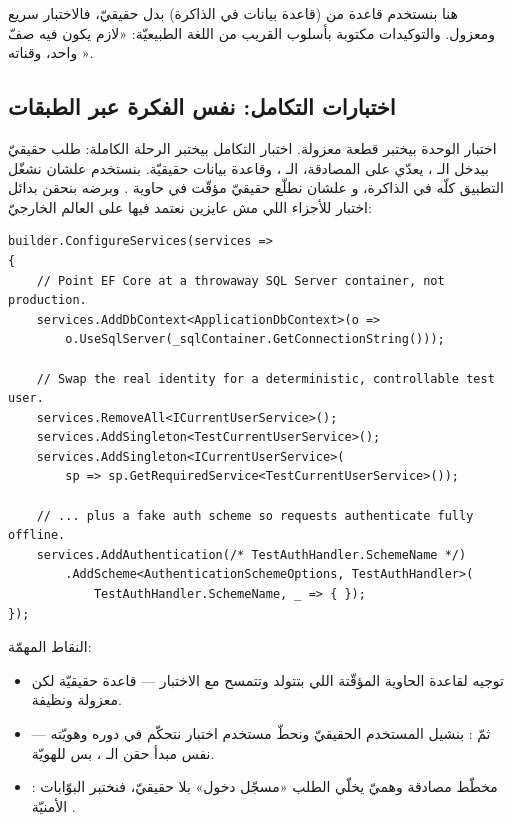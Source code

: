 هنا بنستخدم قاعدة  من  (قاعدة بيانات في الذاكرة) بدل  حقيقيّ، فالاختبار سريع ومعزول. والتوكيدات مكتوبة بأسلوب  القريب من اللغة الطبيعيّة: «لازم يكون فيه صفّ واحد، وقناته ».

\subsection{اختبارات التكامل: نفس الفكرة عبر الطبقات}

اختبار الوحدة بيختبر قطعة معزولة. اختبار التكامل بيختبر الرحلة الكاملة: طلب  حقيقيّ بيدخل الـ ، يعدّي على المصادقة، الـ ، وقاعدة بيانات حقيقيّة. بنستخدم  علشان نشغّل التطبيق كلّه في الذاكرة، و علشان نطلّع  حقيقيّ مؤقّت في حاوية . وبرضه بنحقن بدائل اختبار للأجزاء اللي مش عايزين نعتمد فيها على العالم الخارجيّ:

\begin{english}
\begin{lstlisting}[language={[Sharp]C}]
builder.ConfigureServices(services =>
{
    // Point EF Core at a throwaway SQL Server container, not production.
    services.AddDbContext<ApplicationDbContext>(o =>
        o.UseSqlServer(_sqlContainer.GetConnectionString()));

    // Swap the real identity for a deterministic, controllable test user.
    services.RemoveAll<ICurrentUserService>();
    services.AddSingleton<TestCurrentUserService>();
    services.AddSingleton<ICurrentUserService>(
        sp => sp.GetRequiredService<TestCurrentUserService>());

    // ... plus a fake auth scheme so requests authenticate fully offline.
    services.AddAuthentication(/* TestAuthHandler.SchemeName */)
        .AddScheme<AuthenticationSchemeOptions, TestAuthHandler>(
            TestAuthHandler.SchemeName, _ => { });
});
\end{lstlisting}
\end{english}

النقاط المهمّة:
\begin{itemize}
  \item توجيه  لقاعدة الحاوية المؤقّتة اللي بتتولد وتتمسح مع الاختبار — قاعدة حقيقيّة لكن معزولة ونظيفة.
  \item {} ثمّ : بنشيل المستخدم الحقيقيّ ونحطّ مستخدم اختبار نتحكّم في دوره وهويّته — نفس مبدأ حقن الـ ، بس للهويّة.
  \item {}: مخطّط مصادقة وهميّ يخلّي الطلب «مسجّل دخول» بلا  حقيقيّ، فنختبر البوّابات الأمنيّة .
\end{itemize}

